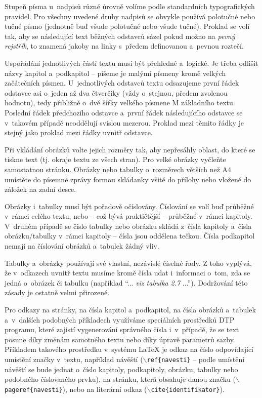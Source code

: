 Stupeň písma u~nadpisů různé úrovně volíme podle standardních typografických pravidel. 
Pro všechny uvedené druhy nadpisů se obvykle používá polotučné nebo tučné písmo (jednotně buď všude polotučné nebo všude tučné). Proklad se volí tak, aby se následující text běžných odstavců sázel pokud možno na {\it pevný rejstřík}, to znamená jakoby na linky s~předem definovanou a~pevnou roztečí.

Uspořádání jednotlivých částí textu musí být přehledné a~logické. Je třeba odlišit názvy kapitol a~podkapitol -- píšeme je malými písmeny kromě velkých začátečních písmen. U~jednotlivých odstavců textu odsazujeme první řádek odstavce asi o~jeden až dva čtverčíky (vždy o~stejnou, předem zvolenou hodnotu), tedy přibližně o~dvě šířky velkého písmene M základního textu. Poslední řádek předchozího odstavce a~první řádek následujícího odstavce se v~takovém případě neoddělují svislou mezerou. Proklad mezi těmito řádky je stejný jako proklad mezi řádky uvnitř odstavce.

Při vkládání obrázků volte jejich rozměry tak, aby nepřesáhly oblast, do které se tiskne text (tj. okraje textu ze všech stran). Pro velké obrázky vyčleňte samostatnou stránku. Obrázky nebo tabulky o~rozměrech větších než A4 umístěte do písemné zprávy formou skládanky všité do přílohy nebo vložené do záložek na zadní desce.

Obrázky i~tabulky musí být pořadově očíslovány. Číslování se volí buď průběžné v~rámci celého textu, nebo -- což bývá praktičtější -- průběžné v~rámci kapitoly. V~druhém případě se číslo tabulky nebo obrázku skládá z~čísla kapitoly a~čísla obrázku/tabulky v~rámci kapitoly -- čísla jsou oddělena tečkou. Čísla podkapitol nemají na číslování obrázků a~tabulek žádný vliv.

Tabulky a~obrázky používají své vlastní, nezávislé číselné řady. Z toho vyplývá, že v~odkazech uvnitř textu musíme kromě čísla udat i~informaci o~tom, zda se jedná o~obrázek či tabulku (například ``... {\it viz tabulka 2.7} ...''). Dodržování této zásady je ostatně velmi přirozené.

Pro odkazy na stránky, na čísla kapitol a~podkapitol, na čísla obrázků a~tabulek a~v~dalších podobných příkladech využíváme speciálních prostředků DTP programu, které zajistí vygenerování správného čísla i~v~případě, že se text posune díky změnám samotného textu nebo díky úpravě parametrů sazby. Příkladem takového prostředku v~systému LaTeX je odkaz na číslo odpovídající umístění značky v~textu, například návěští ($\backslash${\tt ref\{navesti\}} -- podle umístění návěští se bude jednat o~číslo kapitoly, podkapitoly, obrázku, tabulky nebo podobného číslovaného prvku), na stránku, která obsahuje danou značku ($\backslash${\tt pageref\{navesti\}}), nebo na literární odkaz ($\backslash${\tt cite\{identifikator\}}).

